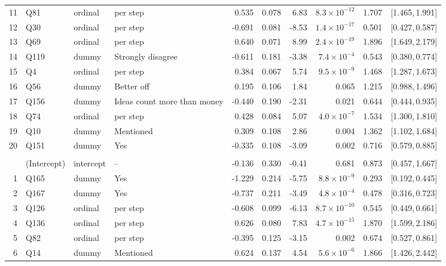\begin{landscape}
\begin{longtable}{r l l l r r r r r c}
11 & Q81 & ordinal & per step & 0.535 & 0.078 & 6.83 & $8.3{\times}10^{-12}$ & 1.707 & [1.465,\,1.991] &  \\
12 & Q30 & ordinal & per step & -0.691 & 0.081 & -8.53 & $1.4{\times}10^{-17}$ & 0.501 & [0.427,\,0.587] &  \\
13 & Q69 & ordinal & per step & 0.640 & 0.071 & 8.99 & $2.4{\times}10^{-19}$ & 1.896 & [1.649,\,2.179] &  \\
14 & Q119 & dummy & Strongly disagree & -0.611 & 0.181 & -3.38 & $7.4{\times}10^{-4}$ & 0.543 & [0.380,\,0.774] &  \\
15 & Q4 & ordinal & per step & 0.384 & 0.067 & 5.74 & $9.5{\times}10^{-9}$ & 1.468 & [1.287,\,1.673] &  \\
\rowcolor{gray!12} 16 & Q56 & dummy & Better off & 0.195 & 0.106 & 1.84 & 0.065 & 1.215 & [0.988,\,1.496] &  \\
17 & Q156 & dummy & Ideas count more than money & -0.440 & 0.190 & -2.31 & 0.021 & 0.644 & [0.444,\,0.935] &  \\
18 & Q74 & ordinal & per step & 0.428 & 0.084 & 5.07 & $4.0{\times}10^{-7}$ & 1.534 & [1.300,\,1.810] &  \\
19 & Q10 & dummy & Mentioned & 0.309 & 0.108 & 2.86 & 0.004 & 1.362 & [1.102,\,1.684] &  \\
20 & Q151 & dummy & Yes & -0.335 & 0.108 & -3.09 & 0.002 & 0.716 & [0.579,\,0.885] &  \\
\addlinespace[4pt]
\multicolumn{9}{l}{\textbf{Cluster 2} \quad \small $n = 2579$ ($n_{\text{in}} = 847$), AIC $= 1484.4$, residual deviance $= 1442.4$ on 2558 df}\\[2pt]
\rowcolor{gray!12}  & (Intercept) & intercept & -- & -0.136 & 0.330 & -0.41 & 0.681 & 0.873 & [0.457,\,1.667] &  \\
1 & Q165 & dummy & Yes & -1.229 & 0.214 & -5.75 & $8.8{\times}10^{-9}$ & 0.293 & [0.192,\,0.445] &  \\
2 & Q167 & dummy & Yes & -0.737 & 0.211 & -3.49 & $4.8{\times}10^{-4}$ & 0.478 & [0.316,\,0.723] &  \\
3 & Q126 & ordinal & per step & -0.608 & 0.099 & -6.13 & $8.7{\times}10^{-10}$ & 0.545 & [0.449,\,0.661] &  \\
4 & Q136 & ordinal & per step & 0.626 & 0.080 & 7.83 & $4.7{\times}10^{-15}$ & 1.870 & [1.599,\,2.186] &  \\
5 & Q82 & ordinal & per step & -0.395 & 0.125 & -3.15 & 0.002 & 0.674 & [0.527,\,0.861] &  \\
6 & Q14 & dummy & Mentioned & 0.624 & 0.137 & 4.54 & $5.6{\times}10^{-6}$ & 1.866 & [1.426,\,2.442] &  \\

\end{longtable}
\end{landscape}
